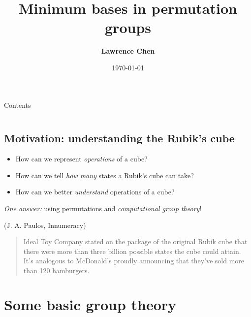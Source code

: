 \documentclass[handout]{beamer}
\title{\textbf{Minimum bases in permutation groups}}
\author{\textbf{Lawrence Chen}}
\institute{\textbf{Honours presentation}}
\date{\today}
\begin{document}
\begin{frame}
    \titlepage
\end{frame}

\begin{frame}{Contents}
    \begin{columns}[t]
        \begin{column}{.5\textwidth}
            \tableofcontents[sections={1-2}]
        \end{column}
        \begin{column}{.5\textwidth}
            \tableofcontents[sections={3-4}]
        \end{column}
    \end{columns}
\end{frame}

\subsection{Motivation: understanding the Rubik's cube}

\begin{slide}
    \begin{itemize}
        \item How can we represent \textit{operations} of a cube? \pause
        \item How can we tell \textit{how many} states a Rubik's cube can take? \pause
        \item How can we better \textit{understand} operations of a cube? \pause
    \end{itemize}

    \textit{One answer:} using permutations and \textit{computational group theory}! \pause

    \begin{alertblock}{(J. A. Paulos, Innumeracy)}
        \vspace{4pt}
        \begin{quotation}
            Ideal Toy Company stated on the package of the original Rubik cube that there were more than three billion possible states the cube could attain. It's analogous to McDonald's proudly announcing that they've sold more than 120 hamburgers.
        \end{quotation}
    \end{alertblock}
\end{slide}

\section{Some basic group theory}
\end{document}

